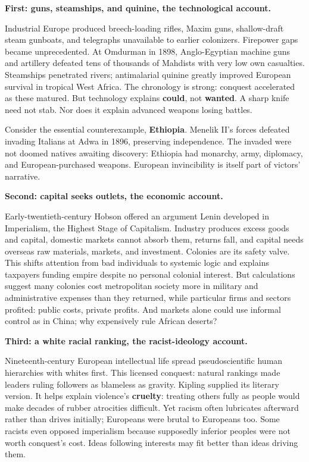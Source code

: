 \textbf{First: guns, steamships, and quinine, the technological account.}

Industrial Europe produced breech-loading rifles, Maxim guns, shallow-draft steam gunboats, and telegraphs unavailable to earlier colonizers. Firepower gaps became unprecedented. At Omdurman in 1898, Anglo-Egyptian machine guns and artillery defeated tens of thousands of Mahdists with very low own casualties. Steamships penetrated rivers; antimalarial quinine greatly improved European survival in tropical West Africa. The chronology is strong: conquest accelerated as these matured. But technology explains \textbf{could}, not \textbf{wanted}. A sharp knife need not stab. Nor does it explain advanced weapons losing battles.

Consider the essential counterexample, \textbf{Ethiopia}. Menelik II's forces defeated invading Italians at Adwa in 1896, preserving independence. The invaded were not doomed natives awaiting discovery: Ethiopia had monarchy, army, diplomacy, and European-purchased weapons. European invincibility is itself part of victors' narrative.

\textbf{Second: capital seeks outlets, the economic account.}

Early-twentieth-century Hobson offered an argument Lenin developed in Imperialism, the Highest Stage of Capitalism. Industry produces excess goods and capital, domestic markets cannot absorb them, returns fall, and capital needs overseas raw materials, markets, and investment. Colonies are its safety valve. This shifts attention from bad individuals to systemic logic and explains taxpayers funding empire despite no personal colonial interest. But calculations suggest many colonies cost metropolitan society more in military and administrative expenses than they returned, while particular firms and sectors profited: public costs, private profits. And markets alone could use informal control as in China; why expensively rule African deserts?

\textbf{Third: a white racial ranking, the racist-ideology account.}

Nineteenth-century European intellectual life spread pseudoscientific human hierarchies with whites first. This licensed conquest: natural rankings made leaders ruling followers as blameless as gravity. Kipling supplied its literary version. It helps explain violence's \textbf{cruelty}: treating others fully as people would make decades of rubber atrocities difficult. Yet racism often lubricates afterward rather than drives initially; Europeans were brutal to Europeans too. Some racists even opposed imperialism because supposedly inferior peoples were not worth conquest's cost. Ideas following interests may fit better than ideas driving them.

